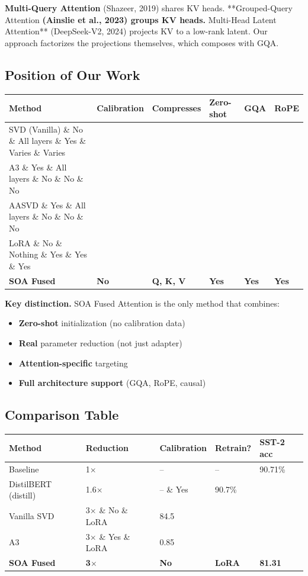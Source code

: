 \textbf{Multi-Query Attention} (Shazeer, 2019) shares KV heads. **Grouped-Query 
Attention\textbf{ (Ainslie et al., 2023) groups KV heads. }Multi-Head Latent 
Attention** (DeepSeek-V2, 2024) projects KV to a low-rank latent. Our 
approach factorizes the projections themselves, which composes with GQA.

\subsection{Position of Our Work}

\begin{table}[H]
\centering
\small
\begin{tabular}{llllll}
\toprule
\textbf{Method} & \textbf{Calibration} & \textbf{Compresses} & \textbf{Zero-shot} & \textbf{GQA} & \textbf{RoPE} \\
\midrule
SVD (Vanilla) \& No \& All layers \& Yes \& Varies \& Varies \\
A3 \& Yes \& All layers \& No \& No \& No \\
AASVD \& Yes \& All layers \& No \& No \& No \\
LoRA \& No \& Nothing \& Yes \& Yes \& Yes \\
\textbf{SOA Fused} & \textbf{No} & \textbf{Q, K, V} & \textbf{Yes} & \textbf{Yes} & \textbf{Yes} \\
\bottomrule
\end{tabular}
\end{table}

\textbf{Key distinction.} SOA Fused Attention is the only method that combines:
\begin{itemize}
\item \textbf{Zero-shot} initialization (no calibration data)
\item \textbf{Real} parameter reduction (not just adapter)
\item \textbf{Attention-specific} targeting
\item \textbf{Full architecture support} (GQA, RoPE, causal)

\end{itemize}


\subsection{Comparison Table}

\begin{table}[H]
\centering
\small
\begin{tabular}{lllll}
\toprule
\textbf{Method} & \textbf{Reduction} & \textbf{Calibration} & \textbf{Retrain?} & \textbf{SST-2 acc} \\
\midrule
Baseline & 1$\times$ & -- & -- & 90.71\% \\
DistilBERT (distill) & 1.6$\times$ & -- \& Yes & 90.7\% \\
Vanilla SVD & 3$\times$ \& No \& LoRA & 84.5 \\
A3 & 3$\times$ \& Yes \& LoRA & 0.85 \\
\textbf{SOA Fused} & \textbf{3$\times$} & \textbf{No} & \textbf{LoRA} & \textbf{81.31} \\
\bottomrule
\end{tabular}
\end{table}

